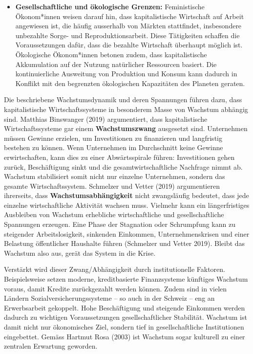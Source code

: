 \documentclass[
  nswissgerman,
  a4paper,
  DIV=11,
  numbers=noendperiod,
  oneside,
  openany]{scrreprt}
\begin{document}
\begin{itemize}
  Kapital führen, da erfolgreiche Unternehmen Marktanteile gewinnen und
  kleinere Unternehmen verdrängen können. Dadurch können dominante
  Unternehmen und monopolähnliche Strukturen entstehen.
\item
  \textbf{Gesellschaftliche und ökologische Grenzen:} Feministische
  Ökonom*innen weisen darauf hin, dass kapitalistische Wirtschaft auf
  Arbeit angewiesen ist, die häufig ausserhalb von Märkten stattfindet,
  insbesondere unbezahlte Sorge- und Reproduktionsarbeit. Diese
  Tätigkeiten schaffen die Voraussetzungen dafür, dass die bezahlte
  Wirtschaft überhaupt möglich ist. Ökologische Ökonom*innen betonen
  zudem, dass kapitalistische Akkumulation auf der Nutzung natürlicher
  Ressourcen basiert. Die kontinuierliche Ausweitung von Produktion und
  Konsum kann dadurch in Konflikt mit den begrenzten ökologischen
  Kapazitäten des Planeten geraten.
\end{itemize}

Die beschriebene Wachstumsdynamik und deren Spannungen führen dazu, dass
kapitalistische Wirtschaftssysteme in besonderem Masse von Wachstum
abhängig sind. Matthias Binswanger (2019) argumentiert, dass
kapitalistische Wirtschaftssysteme gar einem \textbf{Wachstumszwang}
ausgesetzt sind. Unternehmen müssen Gewinne erzielen, um Investitionen
zu finanzieren und langfristig bestehen zu können. Wenn Unternehmen im
Durchschnitt keine Gewinne erwirtschaften, kann dies zu einer
Abwärtsspirale führen: Investitionen gehen zurück, Beschäftigung sinkt
und die gesamtwirtschaftliche Nachfrage nimmt ab. Wachstum stabilisiert
somit nicht nur einzelne Unternehmen, sondern das gesamte
Wirtschaftssystem. Schmelzer und Vetter (2019) argumentieren ihrerseits,
dass \textbf{Wachstumsabhängigkeit} nicht zwangsläufig bedeutet, dass
jede einzelne wirtschaftliche Aktivität wachsen muss. Vielmehr kann ein
längerfristiges Ausbleiben von Wachstum erhebliche wirtschaftliche und
gesellschaftliche Spannungen erzeugen. Eine Phase der Stagnation oder
Schrumpfung kann zu steigender Arbeitslosigkeit, sinkenden Einkommen,
Unternehmenskrisen und einer Belastung öffentlicher Haushalte führen
(Schmelzer und Vetter 2019). Bleibt das Wachstum also aus, gerät das
System in die Krise.

Verstärkt wird dieser Zwang/Abhängigkeit durch institutionelle Faktoren.
Beispielsweise setzen moderne, kreditbasierte Finanzsysteme künftiges
Wachstum voraus, damit Kredite zurückgezahlt werden können. Zudem sind
in vielen Ländern Sozialversicherungssysteme -- so auch in der Schweiz
-- eng an Erwerbsarbeit gekoppelt. Hohe Beschäftigung und steigende
Einkommen werden dadurch zu wichtigen Voraussetzungen gesellschaftlicher
Stabilität. Wachstum ist damit nicht nur ökonomisches Ziel, sondern tief
in gesellschaftliche Institutionen eingebettet. Gemäss Hartmut Rosa
(2003) ist Wachstum sogar kulturell zu einer zentralen Erwartung
geworden.
\end{document}
